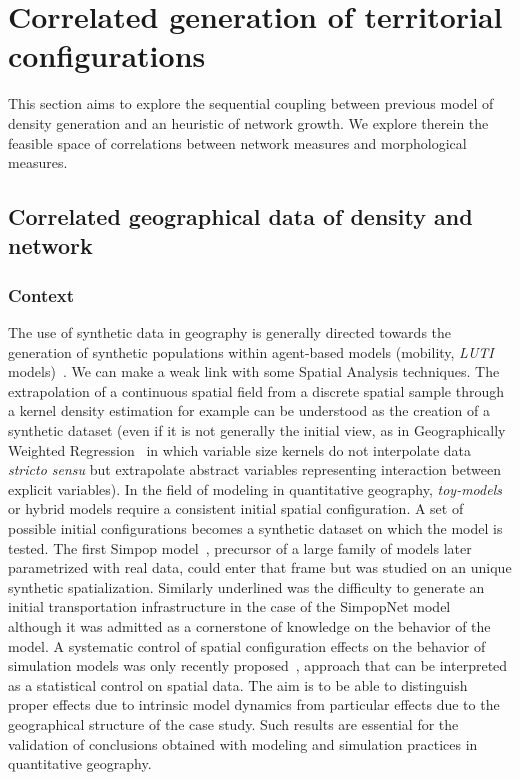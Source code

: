 
\section{Correlated generation of territorial configurations}



This section aims to explore the sequential coupling between previous model of density generation and an heuristic of network growth. We explore therein the feasible space of correlations between network measures and morphological measures.%


\subsection{Correlated geographical data of density and network}


\subsubsection{Context}


The use of synthetic data in geography is generally directed towards the generation of synthetic populations within agent-based models (mobility, \emph{LUTI} models)~\cite{pritchard2009advances}. We can make a weak link with some Spatial Analysis techniques. The extrapolation of a continuous spatial field from a discrete spatial sample through a kernel density estimation for example can be understood as the creation of a synthetic dataset (even if it is not generally the initial view, as in Geographically Weighted Regression~\cite{brunsdon1998geographically} in which variable size kernels do not interpolate data \emph{stricto sensu} but extrapolate abstract variables representing interaction between explicit variables). In the field of modeling in quantitative geography, \emph{toy-models} or hybrid models require a consistent initial spatial configuration. A set of possible initial configurations becomes a synthetic dataset on which the model is tested. The first Simpop model~\cite{sanders1997simpop}, precursor of a large family of models later parametrized with real data, could enter that frame but was studied on an unique synthetic spatialization. Similarly underlined was the difficulty to generate an initial transportation infrastructure in the case of the SimpopNet model~\cite{schmitt2014modelisation} although it was admitted as a cornerstone of knowledge on the behavior of the model. A systematic control of spatial configuration effects on the behavior of simulation models was only recently proposed~\cite{cottineau2015revisiting}, approach that can be interpreted as a statistical control on spatial data. The aim is to be able to distinguish proper effects due to intrinsic model dynamics from particular effects due to the geographical structure of the case study. Such results are essential for the validation of conclusions obtained with modeling and simulation practices in quantitative geography.



